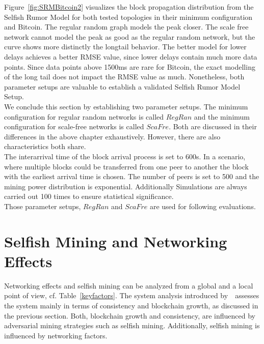 Figure~\ref{fig:SRMBitcoin2} visualizes the block propagation distribution from the Selfish Rumor Model for both tested topologies in their minimum configuration and Bitcoin. The regular random graph models the peak closer. The scale free network cannot model the peak as good as the regular random network, but the curve shows more distinctly the longtail behavior. The better model for lower delays achieves a better RMSE value, since lower delays contain much more data points. Since data points above 1500ms are rare for Bitcoin, the exact modelling of the long tail does not impact the RMSE value as much. Nonetheless, both parameter setups are valuable to establish a validated Selfish Rumor Model Setup.\\
We conclude this section by establishing two parameter setups. The minimum configuration for regular random networks is called $RegRan$ and the minimum configuration for scale-free networks is called $ScaFre$. Both are discussed in their differences in the above chapter exhaustively. However, there are also characteristics both share.\\
The interarrival time of the block arrival process is set to 600s. In a scenario, where multiple blocks could be transferred from one peer to another the block with the earliest arrival time is chosen. The number of peers is set to 500 and the mining power distribution is exponential. Additionally Simulations are always carried out 100 times to ensure statistical significance.\\
Those parameter setups, $RegRan$ and $ScaFre$ are used for following evaluations.

\section{Selfish Mining and Networking Effects}
Networking effects and selfish mining can be analyzed from a global and a local point of view, cf. Table~\ref{keyfactors}. The system analysis introduced by~~assesses the system mainly in terms of consistency and blockchain growth, as discussed in the previous section. Both, blockchain growth and consistency, are influenced by adversarial mining strategies such as selfish mining. Additionally, selfish mining is influenced by networking factors.

